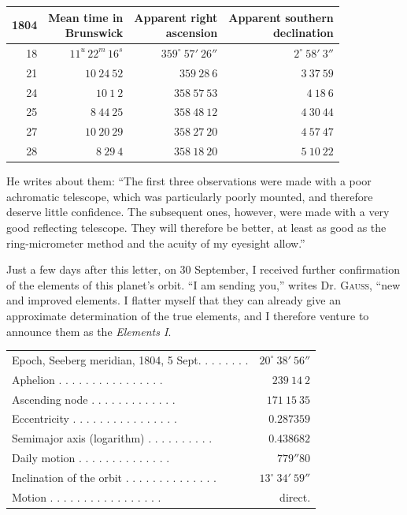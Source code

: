 \begin{center}
\begingroup\fontsize{9}{11}\selectfont\setlength{\tabcolsep}{3pt}\renewcommand{\arraystretch}{1.12}
\begin{tabular}{r|r|r|r}
1804 & \shortstack{Mean time in\\Brunswick} & \shortstack{Apparent right\\ascension} & \shortstack{Apparent southern\\declination} \\ \hline
18 & $11^{u}\,22^{m}\,16^{s}$ & $359^\circ\ 57'\ 26''$ & $2^\circ\ 58'\ 3''$ \\
21 & $10\ 24\ 52$ & $359\ 28\ 6$ & $3\ 37\ 59$ \\
24 & $10\ 1\ 2$ & $358\ 57\ 53$ & $4\ 18\ 6$ \\
25 & $8\ 44\ 25$ & $358\ 48\ 12$ & $4\ 30\ 44$ \\
27 & $10\ 20\ 29$ & $358\ 27\ 20$ & $4\ 57\ 47$ \\
28 & $8\ 29\ 4$ & $358\ 18\ 20$ & $5\ 10\ 22$ \\
\end{tabular}\endgroup
\end{center}

He writes about them: “The first three observations were made with a poor achromatic telescope, which was particularly poorly mounted, and therefore deserve little confidence. The subsequent ones, however, were made with a very good reflecting telescope. They will therefore be better, at least as good as the ring-micrometer method and the acuity of my eyesight allow.”

Just a few days after this letter, on 30 September, I received further confirmation of the elements of this planet’s orbit. “I am sending you,” writes Dr. \textsc{Gauss}, “new and improved elements. I flatter myself that they can already give an approximate determination of the true elements, and I therefore venture to announce them as the \textit{Elements I}.

\begin{center}
\begingroup\fontsize{9}{11}\selectfont\setlength{\tabcolsep}{3pt}
\begin{tabular}{lr}
Epoch, Seeberg meridian, 1804, 5 Sept. . . . . . . . & $20^\circ\ 38'\ 56''$ \\
Aphelion . . . . . . . . . . . . . . . . & $239\ 14\ 2$ \\
Ascending node . . . . . . . . . . . . . & $171\ 15\ 35$ \\
Eccentricity . . . . . . . . . . . . . . . . & $0.287359$ \\
Semimajor axis (logarithm) . . . . . . . . . . & $0.438682$ \\
Daily motion . . . . . . . . . . . . . . & $779''80$ \\
Inclination of the orbit . . . . . . . . . . . . . . & $13^\circ\ 34'\ 59''$ \\
Motion . . . . . . . . . . . . . . . . . & direct. \\
\end{tabular}\endgroup
\end{center}

